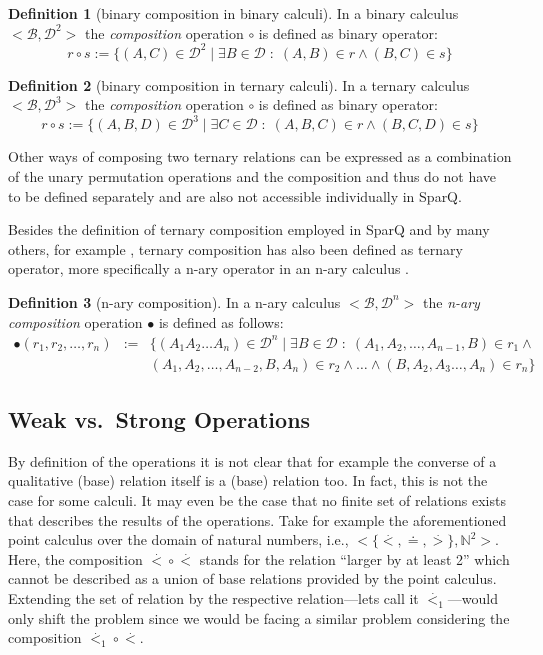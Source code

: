 \documentclass[headsepline]{scrreprt}
\newcommand{\dotl}{\stackrel{.}{<}}
\newcommand{\dotg}{\stackrel{.}{>}}
\theoremstyle{definition}
\newtheorem{defn}{Definition}
\newcommand{\engine}{SparQ}
\begin{document}
\begin{defn}[binary composition in binary calculi] In a binary calculus $<\mathcal{B},\mathcal{D}^2>$ the {\em composition} operation $\circ$ is defined as binary operator:
	$$ r \circ s := \{ (A,C) \in \mathcal{D}^2\; |\; \exists B \in \mathcal{D}\; :\; (A,B) \in r \wedge (B,C) \in s\}$$
\end{defn}

\begin{defn}[binary composition in ternary calculi] In a ternary calculus $<\mathcal{B},\mathcal{D}^3>$ the {\em composition} operation $\circ$ is defined as binary operator:
	$$ r \circ s := \{ (A,B,D) \in \mathcal{D}^3\; |\; \exists C \in \mathcal{D}\; :\; (A,B,C) \in r \wedge (B,C,D) \in s\}$$
\end{defn}

Other ways of composing two ternary relations can be expressed as
a combination of the unary permutation operations and the composition
\citep{scivos01} and thus do not have to be defined separately and are
also not accessible individually in \engine{}.

Besides the definition of ternary composition employed in \engine{} and by many others, for example \cite{cosyfre92}, ternary composition has also been defined as ternary operator, more specifically a n-ary operator in an n-ary calculus \cite{Condotta_Ligozat_Saade_06_A}.

\begin{defn}[n-ary composition] In a n-ary calculus $<\mathcal{B},\mathcal{D}^n>$ the {\em n-ary composition} operation $\bullet$ is defined as follows:
\begin{eqnarray*}
	 \bullet (r_1, r_2, \ldots, r_n) &:=& \{ (A_1 A_2 \ldots A_n) \in \mathcal{D}^n\; |\; \exists B \in \mathcal{D}\; :\; (A_1, A_2, \ldots, A_{n-1}, B) \in r_1 \wedge \\ 
	  & & (A_1, A_2, \ldots, A_{n-2}, B, A_n) \in r_2 \wedge \ldots \wedge (B,  A_2, A_3 \ldots, A_n) \in r_n\}
\end{eqnarray*}
\end{defn}



\subsection{Weak vs.~Strong Operations}

By definition of the operations it is not clear that for example the converse of a qualitative (base) relation itself is a (base) relation too. In fact, this is not the case for some calculi. It may even be the case that no finite set of relations exists that describes the results of the operations. Take for example the aforementioned point calculus \cite{vilain_kautz_beek_89_constraint} over the domain of natural numbers, i.e., $<\{\dotl, \doteq, \dotg \}, \mathbb{N}^2>$. Here, the composition $\dotl \circ \dotl$ stands for the relation ``larger by at least 2'' which cannot be described as a union of base relations provided by the  point calculus. Extending the set of relation by the respective relation---lets call it $\dotl_{1}$---would only shift the problem since we would be facing a similar problem considering the composition $\dotl_{1} \circ \dotl$.
\end{document}
